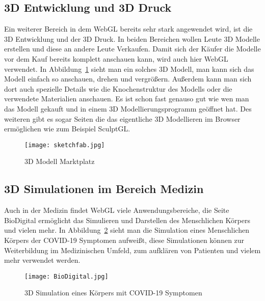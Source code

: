 \subsection{3D Entwicklung und 3D Druck}
Ein weiterer Bereich in dem WebGL bereits sehr stark angewendet wird, ist die 3D Entwicklung und der 3D Druck. In beiden Bereichen wollen Leute 3D Modelle erstellen und diese an andere Leute Verkaufen.
Damit sich der Käufer die Modelle vor dem Kauf bereits komplett anschauen kann, wird auch hier WebGL verwendet. \cite{manuninja}
In Abbildung~\ref{fig:sketchfab} sieht man ein solches 3D Modell, man kann sich das Modell einfach so anschauen, drehen und vergrößern. Außerdem kann man sich dort auch spezielle Details wie die Knochenstruktur des Modells oder
die verwendete Materialien anschauen. Es ist schon fast genauso gut wie wen man das Modell gekauft und in einem 3D Modellierungsprogramm geöffnet hat. Des weiteren gibt es sogar Seiten die das eigentliche 3D Modellieren im Browser ermöglichen wie zum Beispiel SculptGL. \cite{sculptgl}
\begin{figure}
    \centering
    \texttt{[image: sketchfab.jpg]}
    \caption{3D Modell Marktplatz \cite{sketchfab}} \label{fig:sketchfab}
    \end{figure}

\subsection{3D Simulationen im Bereich Medizin}
Auch in der Medizin findet WebGL viele Anwendungsbereiche, die Seite BioDigital ermöglicht das Simulieren und Darstellen des Menschlichen Körpers und vielen mehr.
In Abbildung~\ref{fig:BioDigital} sieht man die Simulation eines Menschlichen Körpers der COVID-19 Symptomen aufweißt, diese Simulationen können zur Weiterbildung im Medizinischen Umfeld, zum aufklären von Patienten und vielem mehr verwendet werden.\cite{BioDigital}
\begin{figure}
    \centering
    \texttt{[image: BioDigital.jpg]}
    \caption{3D Simulation eines Körpers mit COVID-19 Symptomen \cite{BioDigital}} \label{fig:BioDigital}
    \end{figure}